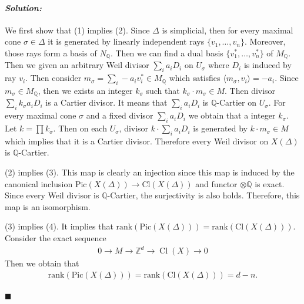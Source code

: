 \documentclass[12pt, a4paper]{article}
\newenvironment{solution}
  {\paragraph{\textit{Solution:}}\par\medskip}
  {\hfill$\blacksquare$\vspace{0.1cm}}
\begin{document}
\begin{solution}
    We first show that (1) implies (2). Since $\Delta$ is simplicial, then for every maximal cone $\sigma\in\Delta$ it is generated by linearly independent rays $\{v_1,\dots,v_n\}$.
    Moreover, those rays form a basis of $N_\mathbb{Q}$. Then we can find a dual basis $\{v_1^*,\dots,v_n^*\}$ of $M_\mathbb{Q}$. Then we given an arbitrary Weil divisor $\sum_i a_iD_i$ on $U_\sigma$ where $D_i$ is induced by ray $v_i$.
    Then consider $m_\sigma = \sum_i -a_iv_i^*\in M_{\mathbb{Q}}$ which satisfies $\langle m_{\sigma},v_i \rangle = -a_i $. Since $m_\sigma\in M_{\mathbb{Q}}$, then we exists an integer $k_\sigma$ such that $k_\sigma\cdot m_\sigma\in M$.
    Then divisor $ \sum_i k_\sigma a_i D_i$ is a Cartier divisor. It means that $\sum_i a_iD_i$ is $\mathbb{Q}$-Cartier on $U_\sigma$.
    For every maximal cone $\sigma$ and a fixed divisor $\sum_i a_i D_i$ we obtain that a integer $k_\sigma$. Let $k=\prod k_\sigma$. Then on each $U_\sigma$, divisor $k\cdot\sum_i a_i D_i$ is generated by $k\cdot m_\sigma\in M$ which implies that it is a Cartier divisor.
    Therefore every Weil divisor on $X(\Delta)$ is $\mathbb{Q}$-Cartier.

    (2) implies (3). This map is clearly an injection since this map is induced by the canonical inclusion $\text{Pic}(X(\Delta))\to \text{Cl}(X(\Delta))$ and functor $\otimes\mathbb{Q}$ is exact.
    Since every Weil divisor is $\mathbb{Q}$-Cartier, the surjectivity is also holds. Therefore, this map is an isomorphism.

    (3) implies (4). It implies that $\text{rank}(\text{Pic}(X(\Delta)))=\text{rank}(\text{Cl}(X(\Delta)))$. Consider the exact sequence
    \begin{align*}
        0 \to M \to \mathbb{Z}^d \to \operatorname{Cl}(X) \to 0
    \end{align*}
    Then we obtain that 
    \begin{align*}
        \text{rank}(\text{Pic}(X(\Delta)))=\text{rank}(\text{Cl}(X(\Delta))) = d-n.
    \end{align*}


\end{solution}
\end{document}
